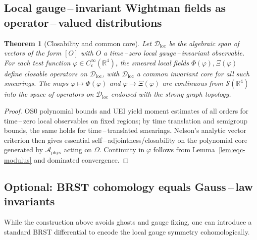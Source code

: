 \documentclass[11pt]{amsart}
\theoremstyle{plain}
\newtheorem{theorem}{Theorem}[section]
\theoremstyle{definition}
\theoremstyle{remark}
\begin{document}
\subsection{Local gauge\,–\,invariant Wightman fields as operator\,–\,valued distributions}

\begin{theorem}[Closability and common core]\label{thm:ovd}
Let $\mathcal D_{\mathrm{loc}}$ be the algebraic span of vectors of the form $[O]$ with $O$ a time\,–\,zero local gauge\,–\,invariant observable. For each test function $\varphi\in C_c^\infty(\mathbb R^4)$, the smeared local fields $\Phi(\varphi),\Xi(\varphi)$ define closable operators on $\mathcal D_{\mathrm{loc}}$, with $\mathcal D_{\mathrm{loc}}$ a common invariant core for all such smearings. The maps $\varphi\mapsto \Phi(\varphi)$ and $\varphi\mapsto \Xi(\varphi)$ are continuous from $\mathcal S(\mathbb R^4)$ into the space of operators on $\mathcal D_{\mathrm{loc}}$ endowed with the strong graph topology.
\end{theorem}
\begin{proof}
OS0 polynomial bounds and UEI yield moment estimates of all orders for time\,–\,zero local observables on fixed regions; by time translation and semigroup bounds, the same holds for time\,–\,translated smearings. Nelson's analytic vector criterion then gives essential self\,–\,adjointness/closability on the polynomial core generated by $\mathcal A_{\mathrm{phys}}$ acting on $\Omega$. Continuity in $\varphi$ follows from Lemma~\ref{lem:eqc-modulus} and dominated convergence.
\end{proof}

\subsection{Optional: BRST cohomology equals Gauss\,–\,law invariants}

While the construction above avoids ghosts and gauge fixing, one can introduce a standard BRST differential to encode the local gauge symmetry cohomologically.
\end{document}
